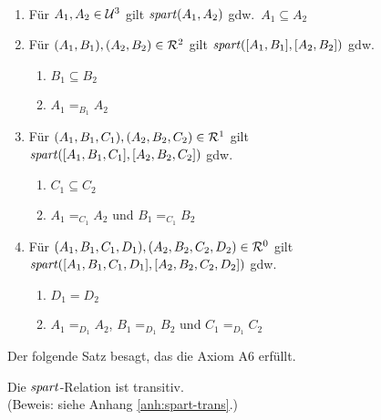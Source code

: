 % 
%     
    \begin{satz}\ \vspace{0pt}

        \begin{enumerate}
            \item Für $A_1, A_2 \in \mathcal{U}^3$ gilt $\mathit{spart}(A_1,A_2)$ gdw.\ $A_1 \subseteq A_2$
            \item Für $(A_1,B_1), (A_2,B_2) \in \mathcal{R}^2$ gilt $\mathit{spart}([A_1,B_1],[A_2,B_2])$ gdw. 
                \begin{enumerate}
                    \item $B_1 \subseteq B_2$
                    \item $A_1 =_{B_1} A_2$
                \end{enumerate}	
            \item Für $(A_1,B_1,C_1), (A_2,B_2,C_2) \in \mathcal{R}^1$ gilt\\
                $\mathit{spart}([A_1,B_1,C_1],[A_2,B_2,C_2])$ gdw. 
                \begin{enumerate}
                    \item $C_1 \subseteq C_2$
                    \item $A_1 =_{C_1} A_2$ und $B_1 =_{C_1} B_2$
                \end{enumerate}	
            \item Für $(A_1,B_1,C_1,D_1), (A_2,B_2,C_2,D_2) \in \mathcal{R}^0$ gilt\\
                $\mathit{spart}([A_1,B_1,C_1,D_1],[A_2,B_2,C_2,D_2])$ gdw.
                \begin{enumerate}
                    \item $D_1 = D_2$
                    \item $A_1 =_{D_1} A_2$, $B_1 =_{D_1} B_2$ und $C_1 =_{D_1} C_2$
                \end{enumerate}	
        \end{enumerate}
        
    \end{satz}
    Der folgende Satz besagt, das die \strukt Axiom A6 erfüllt.
    \begin{satz}\label{satz:spart-trans}
        Die $\mathit{spart}$-Relation ist transitiv.\\
        (Beweis: siehe Anhang \ref{anh:spart-trans}.)
    \end{satz}

    
